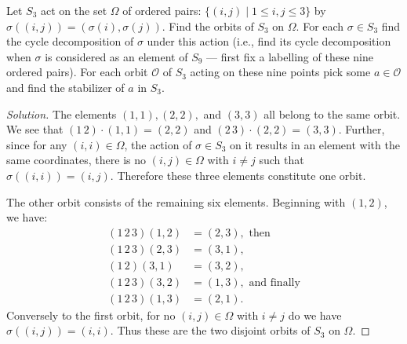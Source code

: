 \documentclass{article}
\begin{document}
Let $S_3$ act on the set $\Omega$ of ordered pairs: $\{ (i, j) \mid 1 \leq i, j \leq 3 \}$ by $\sigma((i, j)) = (\sigma(i), \sigma(j))$. Find the orbits of $S_3$ on $\Omega$. For each $\sigma \in S_3$ find the cycle decomposition of $\sigma$ under this action (i.e., find its cycle decomposition when $\sigma$ is considered as an element of $S_9$ — first fix a labelling of these nine ordered pairs). For each orbit $\mathcal{O}$ of $S_3$ acting on these nine points pick some $a \in \mathcal{O}$ and find the stabilizer of $a$ in $S_3$.

\begin{proof}[Solution]
    The elements $(1, 1), (2, 2),$ and $(3, 3)$ all belong to the same orbit. We see that $(1\,2) \cdot (1, 1) = (2, 2)$ and $(2\,3) \cdot (2, 2) = (3, 3)$. Further, since for any $(i, i) \in \Omega$, the action of $\sigma \in S_3$ on it results in an element with the same coordinates, there is no $(i, j) \in \Omega$ with $i \neq j$ such that $\sigma((i, i)) = (i, j)$. Therefore these three elements constitute one orbit.

    The other orbit consists of the remaining six elements. Beginning with $(1, 2)$, we have:
    \begin{align*}
        (1\,2\,3)(1, 2) &= (2, 3), \text{ then} \\
        (1\,2\,3)(2, 3) &= (3, 1), \\
        (1\,2)(3, 1) &= (3, 2), \\
        (1\,2\,3)(3, 2) &= (1, 3), \text{ and finally} \\
        (1\,2\,3)(1, 3) &= (2, 1).
    \end{align*}
    Conversely to the first orbit, for no $(i, j) \in \Omega$ with $i \neq j$ do we have $\sigma((i, j)) = (i, i)$. Thus these are the two disjoint orbits of $S_3$ on $\Omega$.


\end{proof}
\end{document}
